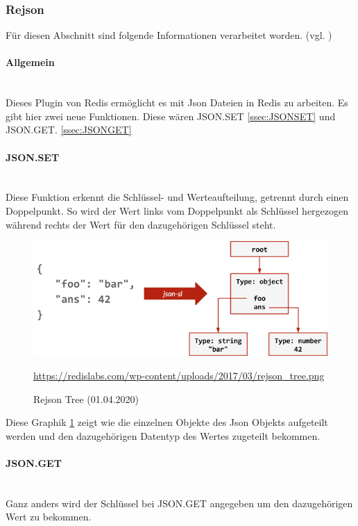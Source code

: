 \subsubsection{Rejson}\label{ssec:Rejson}
Für diesen Abschnitt sind folgende Informationen verarbeitet worden. (vgl. \cite{redislabs_rejson_2020})
\paragraph{Allgemein}\mbox{} \\
Dieses Plugin von Redis ermöglicht es mit Json Dateien in Redis zu arbeiten. Es gibt hier zwei neue Funktionen. Diese wären JSON.SET \ref{ssec:JSONSET} und JSON.GET. \ref{ssec:JSONGET}
\paragraph{JSON.SET}\mbox{}\label{ssec:JSONSET} \\
Diese Funktion erkennt die Schlüssel- und Werteaufteilung, getrennt durch einen Doppelpunkt. So wird der Wert links vom Doppelpunkt als Schlüssel hergezogen während rechts der Wert für den dazugehörigen Schlüssel steht.
\begin{figure}[H]
\centering
  \includegraphics[scale=0.5]{images/rejson_tree.png}
  \caption[Rejson Tree (01.04.2020)]{Rejson Tree (01.04.2020)}
  \url{https://redislabs.com/wp-content/uploads/2017/03/rejson_tree.png}
  \label{fig:Rejson-Tree}
\end{figure}
Diese Graphik \ref{fig:Rejson-Tree} zeigt wie die einzelnen Objekte des Json Objekts aufgeteilt werden und den dazugehörigen Datentyp des Wertes zugeteilt bekommen. 
\paragraph{JSON.GET}\mbox{}\label{ssec:JSONGET} \\
Ganz anders wird der Schlüssel bei JSON.GET angegeben um den dazugehörigen Wert zu bekommen.
